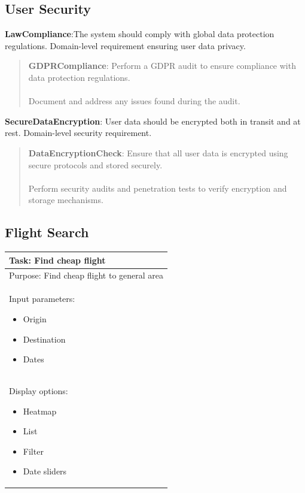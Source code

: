 \subsection{User Security}
\textbf{LawCompliance}:The system should comply with global data protection regulations. Domain-level requirement ensuring user data privacy.
\begin{quote}
    \textbf{GDPRCompliance}: Perform a GDPR audit to ensure compliance with data protection regulations. \\ \\
    Document and address any issues found during the audit.
\end{quote}
\textbf{SecureDataEncryption}: User data should be encrypted both in transit and at rest. Domain-level security requirement.
\begin{quote}
    \textbf{DataEncryptionCheck}: Ensure that all user data is encrypted using secure protocols and stored securely. \\ \\
    Perform security audits and penetration tests to verify encryption and storage mechanisms.
\end{quote}

\subsection{Flight Search}

\begin{tabular}{|p{}|}
    \hline
    \textbf{Task: Find cheap flight}\\
    \hline
    Purpose: Find cheap flight to general area\\
    \hline
    Input parameters:
    \begin{itemize}
        \item Origin
        \item Destination
        \item Dates
    \end{itemize}\\
    \hline
    Display options:
    \begin{itemize}
        \item Heatmap
        \item List
        \item Filter
        \item Date sliders
    \end{itemize}\\
    \hline
\end{tabular}

